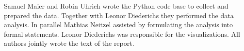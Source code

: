 \documentclass{article}
\theoremstyle{plain}
\theoremstyle{definition}
\theoremstyle{remark}
\begin{document}
Samuel Maier and Robin Uhrich wrote the Python code base to collect and prepared the data. Together with Leonor Diederichs they performed the data analysis. In parallel Mathias Neitzel assisted by formulating the analysis into formal statements. Leonor Diederichs was responsible for the visualizations. All authors jointly wrote the text of the report. \\    





\end{document}
